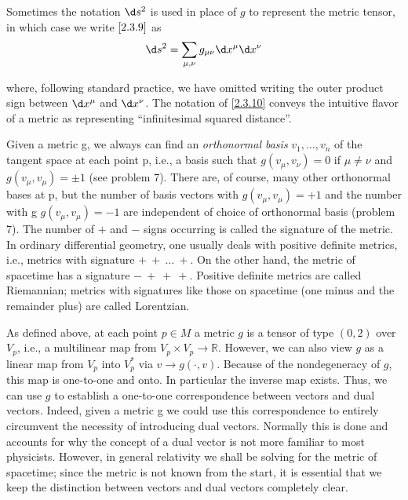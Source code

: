 Sometimes the notation $\d s^2$ is used in place of $g$ to represent the metric tensor, in which case we write $\eqref{2.3.9}$ as
\begin{equation}
    \d s^2=\sum_{\mu,\nu}g_{\mu\nu}\d x^\mu\d x^\nu
    \label{2.3.10}
\end{equation}

where, following standard practice, we have omitted writing the outer product sign between $\d x^\mu$ and $\d x^\nu$. The notation of \eqref{2.3.10} conveys the intuitive flavor of a metric as representing ``infinitesimal squared distance''.

Given a metric g, we always can find an \emph{orthonormal basis} $v_1,\ldots,v_n$ of the tangent space at each point p, i.e., a basis such that $g(v_\mu,v_\nu)=0$ if $\mu\neq\nu$ and $g(v_\mu,v_\mu)=\pm 1$ (see problem 7). There are, of course, many other orthonormal bases at p, but the number of basis vectors with $g(v_\mu,v_\mu)=+1$ and the number with g $g(v_\mu,v_\mu)=-1$ are independent of choice of orthonormal basis (problem 7). The number of $+$ and $-$ signs occurring is called the signature of the metric. In ordinary differential geometry, one usually deals with positive definite metrics, i.e., metrics with signature $+\ +\ \ldots\ +$. On the other hand, the metric of spacetime has a signature $-\ +\ +\ +$. Positive definite metrics are called Riemannian; metrics with signatures like those on spacetime (one minus and the remainder plus) are called Lorentzian.

As defined above, at each point $p\in M$ a metric $g$ is a tensor of type $(0,2)$ over $V_p$, i.e., a multilinear map from $V_p\times V_p\to\mathbb{R}$. However, we can also view $g$ as a linear map from $V_p$ into $V_p^*$ via $v\to g(\cdot,v)$. Because of the nondegeneracy of $g$, this map is one-to-one and onto. In particular the inverse map exists. Thus, we can use $g$ to establish a one-to-one correspondence between vectors and dual vectors. Indeed, given a metric g we could use this correspondence to entirely circumvent the necessity of introducing dual vectors. Normally this is done and accounts for why the concept of a dual vector is not more familiar to most physicists. However, in general relativity we shall be solving for the metric of spacetime; since the metric is not known from the start, it is essential that we keep the distinction between vectors and dual vectors completely clear.

